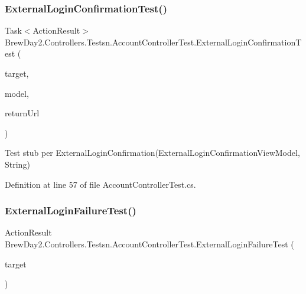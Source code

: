 \subsubsection{\texorpdfstring{External\+Login\+Confirmation\+Test()}{ExternalLoginConfirmationTest()}}
{\footnotesize\ttfamily Task$<$Action\+Result$>$ Brew\+Day2.\+Controllers.\+Testsn.\+Account\+Controller\+Test.\+External\+Login\+Confirmation\+Test (\begin{DoxyParamCaption}\item[{\mbox{[}\+Pex\+Assume\+Under\+Test\mbox{]} \mbox{\hyperlink{class_brew_day2_1_1_controllers_1_1_account_controller}{Account\+Controller}}}]{target,  }\item[{\mbox{\hyperlink{class_brew_day2_1_1_models_1_1_external_login_confirmation_view_model}{External\+Login\+Confirmation\+View\+Model}}}]{model,  }\item[{string}]{return\+Url }\end{DoxyParamCaption})}



Test stub per External\+Login\+Confirmation(\+External\+Login\+Confirmation\+View\+Model, String)



Definition at line 57 of file Account\+Controller\+Test.\+cs.

\mbox{\label{class_brew_day2_1_1_controllers_1_1_testsn_1_1_account_controller_test_a0f3fe5d1de5b1fb204f5060eec578575}} 
\subsubsection{\texorpdfstring{External\+Login\+Failure\+Test()}{ExternalLoginFailureTest()}}
{\footnotesize\ttfamily Action\+Result Brew\+Day2.\+Controllers.\+Testsn.\+Account\+Controller\+Test.\+External\+Login\+Failure\+Test (\begin{DoxyParamCaption}\item[{\mbox{[}\+Pex\+Assume\+Under\+Test\mbox{]} \mbox{\hyperlink{class_brew_day2_1_1_controllers_1_1_account_controller}{Account\+Controller}}}]{target }\end{DoxyParamCaption})}



